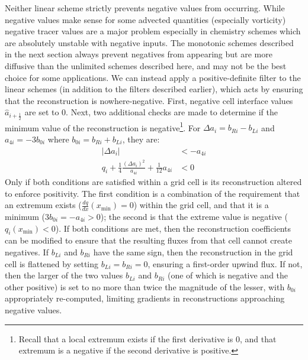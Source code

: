 \documentclass[10pt,letterpaper,margin=1in]{memoir}
\newcommand{\half}{\frac{1}{2}}
\begin{document}
Neither linear scheme strictly prevents negative values from occurring. While negative values make sense for some advected quantities (especially vorticity) negative tracer values are a major problem especially in chemistry schemes which are absolutely unstable with negative inputs. The monotonic schemes described in the next section always prevent negatives from appearing but are more diffusive than the unlimited schemes described here, and may not be the best choice for some applications. We can instead apply a positive-definite filter to the linear schemes (in addition to the filters described earlier), which acts by ensuring that the reconstruction is nowhere-negative. First, negative cell interface values  $\widehat{a}_{i+\half}$ are set to 0. Next, two additional checks are made to determine if the minimum value of the reconstruction is negative\footnote{Recall that a local extremum exists if the first derivative is 0, and that extremum is a negative if the second derivative is positive.}. For $\Delta a_{i} = b_{Ri} - b_{Li}$ and $a_{4i} = -3b_{0i}$ where $b_{0i} = b_{Ri} + b_{Li}$, they are:
\begin{equation}
\begin{split}
\left | \Delta a_{i} \right | & <  -a_{4i} \\
q_i + \frac{1}{4} \frac{\left ( \Delta a_i \right )^2}{a_{4i}} + \frac{1}{12}a_{4i}   & < 0
\end{split}
\end{equation}
Only if both conditions are satisfied within a grid cell is its reconstruction altered to enforce positivity. The first condition is a combination of the requirement that an extremum exists ($\frac{dq}{dx}\left ( x_{\min} \right ) = 0$) within the grid cell, and that it is a minimum ($3b_{0i} = -a_{4i} > 0$); the second is that the extreme value is negative ($q_i \left ( x_{\min} \right ) < 0$). If both conditions are met, then the reconstruction coefficients can be modified to ensure that the resulting fluxes from that cell cannot create negatives. If $b_{Li}$ and $b_{Ri}$ have the same sign, then the reconstruction in the grid cell is flattened by setting $b_{Li} = b_{Ri} = 0$, ensuring a first-order upwind flux. If not, then the larger of the two values $b_{Li}$ and $b_{Ri}$ (one of which is negative and the other positive) is set to no more than twice the magnitude of the lesser, with $b_{0i}$ appropriately re-computed, limiting gradients in reconstructions approaching negative values.

\end{document}
